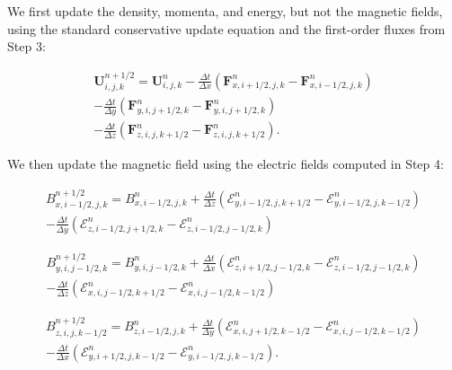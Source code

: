 \documentclass[modern, linenumbers]{aastex631}
\begin{document}
We first update the density, momenta, and energy, but not the magnetic fields, using the standard conservative update equation and the first-order fluxes from Step 3:

\begin{equation}
    \begin{aligned}
        \boldsymbol{U}^{n+1/2}_{i,j,k} = \boldsymbol{U}^{n}_{i,j,k}
        - \frac{\Delta t}{\Delta x} \left( \boldsymbol{F}^n_{x,i+1/2,j,k} - \boldsymbol{F}^n_{x,i-1/2,j,k} \right) \\
        - \frac{\Delta t}{\Delta y} \left( \boldsymbol{F}^n_{y,i,j+1/2,k} - \boldsymbol{F}^n_{y,i,j+1/2,k} \right) \\
        - \frac{\Delta t}{\Delta z} \left( \boldsymbol{F}^n_{z,i,j,k+1/2} - \boldsymbol{F}^n_{z,i,j,k+1/2} \right).
    \end{aligned}
\end{equation}

We then update the magnetic field using the electric fields computed in Step 4:

\begin{equation}
    \begin{aligned}
        B^{n+1/2}_{x,i-1/2,j,k} = B^{n}_{x,i-1/2,j,k}
        + \frac{\Delta t}{\Delta z} \left( \mathcal{E}^n_{y,i-1/2,j,k+1/2} - \mathcal{E}^n_{y,i-1/2,j,k-1/2} \right) \\
        - \frac{\Delta t}{\Delta y} \left( \mathcal{E}^n_{z,i-1/2,j+1/2,k} - \mathcal{E}^n_{z,i-1/2,j-1/2,k} \right)
    \end{aligned}
\end{equation}

\begin{equation}
    \begin{aligned}
        B^{n+1/2}_{y,i,j-1/2,k} = B^{n}_{y,i,j-1/2,k}
        + \frac{\Delta t}{\Delta x} \left( \mathcal{E}^n_{z,i+1/2,j-1/2,k} - \mathcal{E}^n_{z,i-1/2,j-1/2,k} \right) \\
        - \frac{\Delta t}{\Delta z} \left( \mathcal{E}^n_{x,i,j-1/2,k+1/2} - \mathcal{E}^n_{x,i,j-1/2,k-1/2} \right)
    \end{aligned}
\end{equation}

\begin{equation}
    \begin{aligned}
        B^{n+1/2}_{z,i,j,k-1/2} = B^{n}_{z,i-1/2,j,k}
        + \frac{\Delta t}{\Delta y} \left( \mathcal{E}^n_{x,i,j+1/2,k-1/2} - \mathcal{E}^n_{x,i,j-1/2,k-1/2} \right) \\
        - \frac{\Delta t}{\Delta x} \left( \mathcal{E}^n_{y,i+1/2,j,k-1/2} - \mathcal{E}^n_{y,i-1/2,j,k-1/2} \right).
    \end{aligned}
\end{equation}
\end{document}
